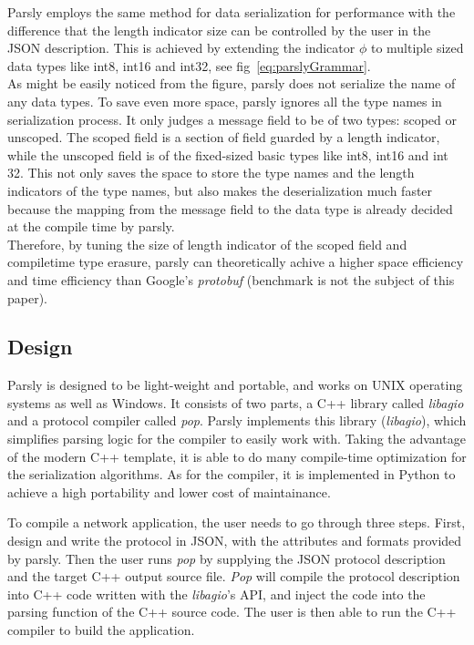 \documentclass{article}
\begin{document}
Parsly employs the same method for data serialization for performance with the difference that the length indicator size can be controlled by the user in the JSON description. This is achieved by extending the indicator $\phi$ to multiple sized data types like int8, int16 and int32, see fig~\ref{eq:parslyGrammar}. \\

As might be easily noticed from the figure, parsly does not serialize the name of any data types. To save even more space, parsly ignores all the type names in serialization process. It only judges a message field to be of two types: scoped or unscoped. The scoped field is a section of field guarded by a length indicator, while the unscoped field is of the fixed-sized basic types like int8, int16 and int 32. This not only saves the space to store the type names and the length indicators of the type names, but also makes the deserialization much faster because the mapping from the message field to the data type is already decided at the compile time by parsly.  \\

Therefore, by tuning the size of length indicator of the scoped field and compiletime type erasure, parsly can theoretically achive a higher space efficiency and time efficiency than Google's \textit{protobuf} (benchmark is not the subject of this paper). \\




\subsection{Design}
Parsly is designed to be light-weight and portable, and works on UNIX operating systems as well as Windows. It consists of two parts, a C++ library called \textit{libagio} and a protocol compiler called \textit{pop}. Parsly implements this library (\textit{libagio}), which simplifies parsing logic for the compiler to easily work with. Taking the advantage of the modern C++ template, it is able to do many compile-time optimization for the serialization algorithms. As for the compiler, it is implemented in Python to achieve a high portability and lower cost of maintainance. 

To compile a network application, the user needs to go through three steps. First, design and write the protocol in JSON, with the attributes and formats provided by parsly. Then the user runs \textit{pop} by supplying the JSON protocol description and the target C++ output source file. \textit{Pop} will compile the protocol description into C++ code written with the \textit{libagio}'s API, and inject the code into the parsing function of the C++ source code. The user is then able to run the C++ compiler to build the application.
\end{document}

